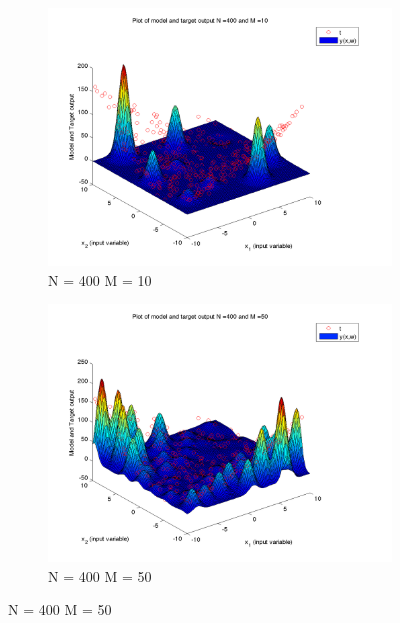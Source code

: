 \documentclass{article}
\begin{document}
\begin{figure}[H]

\begin{subfigure}{.5\textwidth}
\centering
\includegraphics[width=\linewidth]{D2/VaryingM_N400M10}
\caption{N = 400 M = 10}
\end{subfigure}
\begin{subfigure}{.5\textwidth}
\includegraphics[width=\linewidth]{D2/VaryingM_N400M50}
\caption{N = 400 M = 50}
\end{subfigure}



\end{figure}
\end{document}
